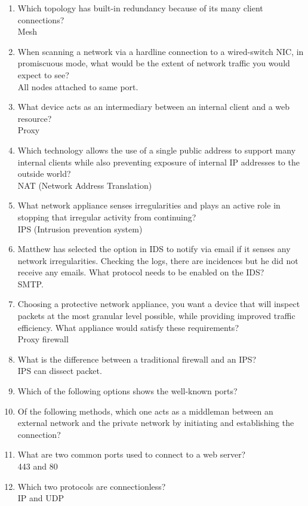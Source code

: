 \begin{enumerate}
    \item Which topology has built-in redundancy because of its many client connections?\\Mesh
    \item When scanning a network via a hardline connection to a wired-switch NIC, in promiscuous mode, what would be the extent of network traffic you would expect to see?\\All nodes attached to same port.
    \item What device acts as an intermediary between an internal client and a web resource?\\Proxy
    \item Which technology allows the use of a single public address to support many internal clients while also preventing exposure of internal IP addresses to the outside world?\\NAT (Network Address Translation)
    \item What network appliance senses irregularities and plays an active role in stopping that irregular activity from continuing?\\IPS (Intrusion prevention system)
    \item Matthew has selected the option in IDS to notify via email if it senses any network irregularities. Checking the logs, there are incidences but he did not receive any emails. What protocol needs to be enabled on the IDS?\\SMTP.
    \item Choosing a protective network appliance, you want a device that will inspect packets at the most granular level possible, while providing improved traffic efficiency. What appliance would satisfy these requirements?\\Proxy firewall
    \item What is the difference between a traditional firewall and an IPS?\\IPS can dissect packet.
    \item Which of the following options shows the well-known ports?\\
    \item Of the following methods, which one acts as a middleman between an external network and the private network by initiating and establishing the connection?
    \item What are two common ports used to connect to a web server?\\443 and 80
    \item Which two protocols are connectionless?\\IP and UDP

\end{enumerate}
